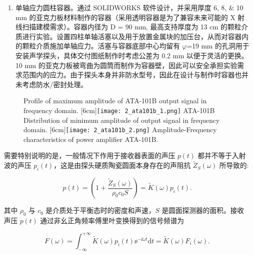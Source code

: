 \begin{enumerate}
  \item 单轴应力圆柱容器。通过 SOLIDWORKS 软件设计，并采用厚度 \numlist{6;8;10} \unit{\milli\meter} 的亚克力板材料制作的容器（采用透明容器是为了兼容未来可能的 X 射线扫描建模需求）。容器内径为 D = 90 \unit{\milli\meter}, 最高支持厚度为 13 \unit{\centi\meter} 的颗粒介质进行实验。设置四柱单轴活塞以及用于放置金属块的加压台，从而对容器内的颗粒介质施加单轴应力。活塞与容器底部中心均留有 $\varphi$=19 \unit{\milli\meter} 的孔洞用于安装声学探头，具体交付图纸制作时考虑公差为 0.2 \unit{\milli\meter} 以便于灵活的更换。10 \unit{\milli\meter} 的亚克力板被弯曲为圆筒而制作为容器壁，因此可以安全承担实验需求范围内的应力。由于探头本身并非防水型号，因此在设计与制作时容器也并未考虑防水/密封处理。
\end{enumerate}

\begin{figure}[!hbtp]
  \centering
                  {Profile of maximum amplitude of ATA-101B output signal in frequency domain.}%
                  [6cm]{\texttt{[image: 2\_ata101b\_1.png]}}
  \hspace{1cm}
                  {ATA-101B Distribution of minimum amplitude of output signal in frequency domain.}%
                  [6cm]{\texttt{[image: 2\_ata101b\_2.png]}}
            {Amplitude-Frequency characteristics of power amplifier ATA-101B.}
  \label{fig:amp_freq_curve}
\end{figure}


需要特别说明的是，一般情况下作用于接收器表面的声压 $p(t)$ 都并不等于入射波的声压 $p_{i}(t)$，这是由探头硬质陶瓷圆面本身存在的声阻抗 $\widetilde{Z}_{S}(\omega)$ 所导致的:

\begin{equation}
  p(t) = \left(1 + \frac{\widetilde{Z}_{S}(\omega)}{\rho_{0}c_{0}S}\right) =\widetilde{K}(\omega)p_{i}(t).
\end{equation}

其中 $\rho_{0}$ 与 $c_{0}$ 是介质处于平衡态时的密度和声速，$S$ 是圆面探测器的面积。接收声压 $p(t)$ 通过非幺正角频率傅里叶变换得到的信号频谱为

\begin{equation}
  F(\omega) = \int_{-\infty}^{+\infty}\widetilde{K}(\omega)p_{i}(t){\ee}^{-\ii\omega t}\mathrm{d}t = \widetilde{K}(\omega)F_{i}(\omega).
\end{equation}

